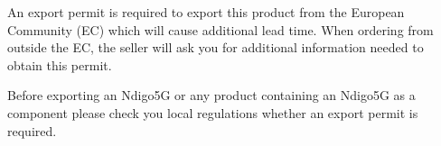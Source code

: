 An export permit is required to export this product from the European Community (EC) which will cause additional lead time. When ordering from outside the EC, the seller will ask you for additional information needed to obtain this permit.

Before exporting an Ndigo5G or any product containing an Ndigo5G as a component please check you local regulations whether an export permit is required.